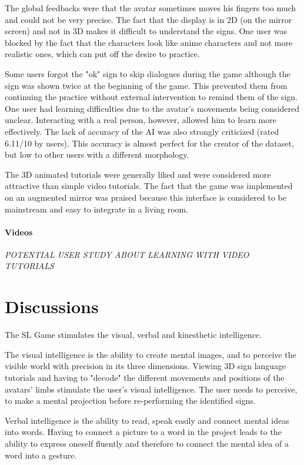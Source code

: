 The global feedbacks were that the avatar sometimes moves his fingers too much and could not be very precise. The fact that the display is in 2D (on the mirror screen) and not in 3D makes it difficult to understand the signs.
One user was blocked by the fact that the characters look like anime characters and not more realistic ones, which can put off the desire to practice.

Some users forgot the "ok" sign to skip dialogues during the game although the sign was shown twice at the beginning of the game. This prevented them from continuing the practice without external intervention to remind them of the sign. 
One user had learning difficulties due to the avatar's movements being considered unclear. Interacting with a real person, however, allowed him to learn more effectively. The lack of accuracy of the AI was also strongly criticized (rated 6.11/10 by users). This accuracy is almost perfect for the creator of the dataset, but low to other users with a different morphology.

The 3D animated tutorials were generally liked and were considered more attractive than simple video tutorials. The fact that the game was implemented on an augmented mirror was praised because this interface is considered to be mainstream and easy to integrate in a living room.


\paragraph{Videos}

\textit{POTENTIAL USER STUDY ABOUT LEARNING WITH VIDEO TUTORIALS}

\section{Discussions}

The SL Game stimulates the visual, verbal and kinesthetic intelligence. 

The visual intelligence is the ability to create mental images, and to perceive the visible world with precision in its three dimensions. Viewing 3D sign language tutorials and having to "decode" the different movements and positions of the avatars' limbs stimulate the user's visual intelligence. The user needs to perceive, to make a mental projection before re-performing the identified signs.

Verbal intelligence is the ability to read, speak easily and connect mental ideas into words. Having to connect a picture to a word in the project leads to the ability to express oneself fluently and therefore to connect the mental idea of a word into a gesture. 

